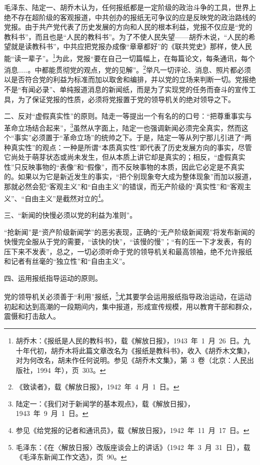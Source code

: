 毛泽东、陆定一、胡乔木认为，任何报纸都是一定阶级的政治斗争的工具，世界上绝不存在超阶级的客观报道，中共创办的报纸无可争议的应是反映党的政治路线的党报。由于共产党代表了历史发展的方向和人民的根本利益，党报不仅应是“党的教科书”，而且也是“人民的教科书”。为了不使人民失望——胡乔木说，“人民的希望就是读教科书”，中共应把党报办成像“章章都好”的《联共党史》那样，使人民能“读一辈子”。\footnote{胡乔木：《报纸是人民的教科书》，载《解放日报》，1943~年~1~月~26~日。九十年代初，胡乔木将此篇文章改名为《报纸是教科书》，收入《胡乔木文集》，对为何改名，胡未作任何说明。参见《胡乔木文集》，第~3~卷（北京：人民出版社，1994~年），页~303。}为此，党报“要在自己一切篇幅上，在每篇论文，每条通讯，每个消息.....。中都能贯彻党的观点，党的见解”。\footnote{《致读者》，载《解放日报》，1942~年~4~月~1~日。}举凡一切评论、消息、照片都必须以是否符合党的利益为标准而加以取舍和编排，并以党的立场来判断一切。党报绝不是“有闻必录”、单纯报道消息的新闻纸，而是为了实现党的任务而奋斗的宣传工具，为了保证党报的性质，必须将党报置于党的领导机关的绝对领导之下。

二、反对“虚假真实性”的原则。陆走一等提出一个有名的的口号：“把尊重事实与革命立场结合起来”，\footnote{陆定一：《我们对于新闻学的基本观点》，载《解放日报》，1943~年~9~月~1~日。}虽然从字面上，陆定一也强调新闻必须完全真实，然而这个“事实”必须置于“革命立场”的统帅之下。于是，陆定一等从列宁那儿引进了“两种真实性”的观点：一种是所谓“本质真实性”即代表了历史发展方向的事实，尽管它尚处于萌芽状态或尚未发生，但从本质上讲它却是真实的；相反，“虚假真实性”只反映事物的“表像”和“假像”，而不反映事物的本质，因此它必定是不真实的。如果以为它是新近发生的事实，“把个别现象夸大成为整体现象”而加以报道，那就必然会犯“客观主义”和“自由主义”的错误，而无产阶级的“真实性”和“客观主义”、“自由主义”是截然对立的\footnote{参见《给党报的记者和通讯员》，载《解放日报》，1942~年~11~月~17~日。}。

三、“新闻的快慢必须以党的利益为准则”。

“抢新闻”是“资产阶级新闻学”的恶劣表现，正确的“无产阶级新闻观”将发布新闻的快慢完全服从于党的需要，“该快的快”，“该慢的慢”；“有的压一下才发表，有的压下来不发表”，总之，一切必须听命于党的领导机关和最高领袖，绝不允许报纸和记者有丝毫的“独立性”和“自由主义”。

四、运用报纸指导运动的原则。

党的领导机关必须善于“利用”报纸，\footnote{毛泽东：《在〈解放日报〉改版座谈会上的讲话》（1942~年~3~月~31~日），载《毛泽东新闻工作文选》，页~90。}尤其要学会运用报纸指导政治运动，在运动初起和达到高潮的一段期间内，集中报道，形成宣传规模，用以教育干部和群众，震慑和打击敌人。

